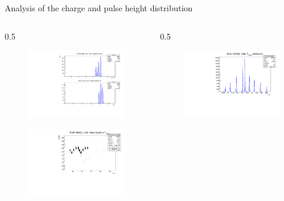 \documentclass{beamer}[10pt]
\begin{document}
\begin{frame}{Analysis of the charge and pulse height distribution}
  \vspace{-6mm}
  \begin{columns}
  \begin{column}{0.5\framewidth}
  \begin{figure}[H]
     \centering
     \includegraphics[width= .85\columnwidth]{figures/pdf/p.pdf}
     \label{fig:wffytl}
   \end{figure}
  \vspace{-8mm}
  \begin{figure}[H]
     \centering
     \includegraphics[width= .85\columnwidth]{figures/pdf/phtmean.pdf}
     \label{fig:wffytl}
   \end{figure}
  \end{column}
  \begin{column}{0.5\framewidth}
  \begin{figure}[H]
     \centering
     \includegraphics[width= .82\columnwidth]{figures/pdf/tmean.pdf}

\end{figure}
\end{column}
\end{columns}
\end{frame}
\end{document}
